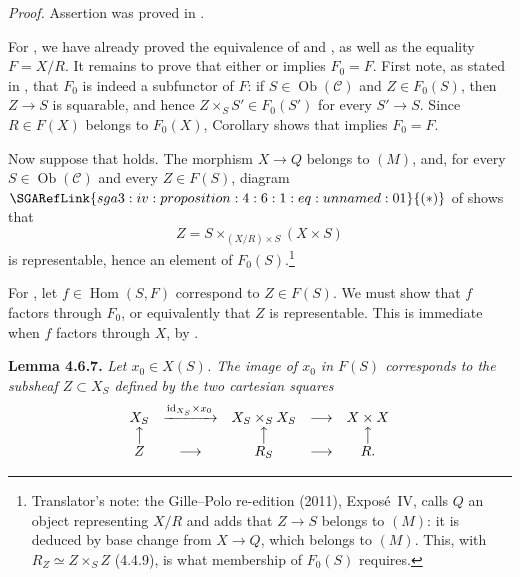 \noindent\textit{Proof.}
Assertion  was proved in .

For , we have already proved the equivalence of  and , as well
as the equality \(F=X/R\). It remains to prove that either  or 
implies \(F_0=F\). First note, as stated in , that \(F_0\) is
indeed a subfunctor of \(F\): if \(S\in\operatorname{Ob}(\mathscr C)\)
and \(Z\in F_0(S)\), then \(Z\to S\) is squarable, and hence
\(Z\times_SS'\in F_0(S')\) for every \(S'\to S\). Since
\(R\in F(X)\) belongs to \(F_0(X)\), Corollary  shows that 
implies \(F_0=F\).

Now suppose that  holds. The morphism \(X\to Q\) belongs to \((M)\), and, for
every \(S\in\operatorname{Ob}(\mathscr C)\) and every \(Z\in F(S)\), diagram
\(\SGARefLink{sga3:iv:proposition:4:6:1:eq:unnamed:01}{(*)}\) of  shows that
\[
 Z=S\times_{(X/R)\times S}(X\times S)
\]
is representable, hence an element of \(F_0(S)\).\footnote{Translator's note: the Gille--Polo re-edition (2011), Expos\'e~IV, calls
\(Q\) an object representing \(X/R\) and adds that \(Z\to S\) belongs to
\((M)\): it is deduced by base change from \(X\to Q\), which belongs to
\((M)\). This, with \(R_Z\simeq Z\times_SZ\) (4.4.9), is what membership of
\(F_0(S)\) requires.}

For , let \(f\in\operatorname{Hom}(S,F)\) correspond to
\(Z\in F(S)\). We must show that \(f\) factors through \(F_0\), or
equivalently that \(Z\) is representable. This is immediate when \(f\)
factors through \(X\), by .

\medskip
\noindent{}\textbf{Lemma 4.6.7.}
\textit{Let \(x_0\in X(S)\). The image of \(x_0\) in \(F(S)\)
corresponds to the subsheaf \(Z\subset X_S\) defined by the two
cartesian squares}
\[
\begin{array}{ccccc}
 X_S&\xrightarrow{\mathrm{id}_{X_S}\times x_0}&
 X_S\times_SX_S&\longrightarrow&X\times X\cr
 \big\uparrow&&\big\uparrow&&\big\uparrow\cr
 Z&\longrightarrow&R_S&\longrightarrow&R.
\end{array}
\]

